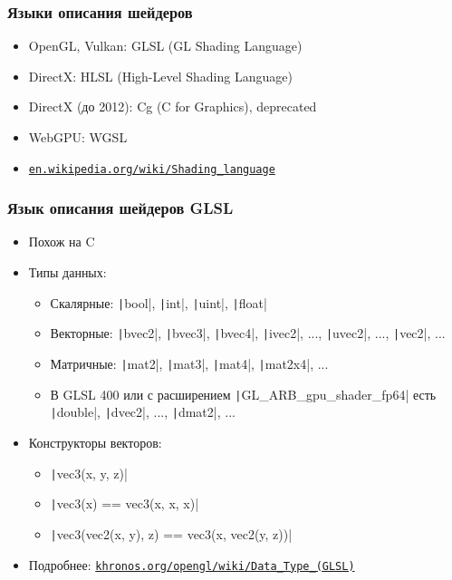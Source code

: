 \documentclass[10pt]{beamer}
\begin{document}
\begin{frame}[fragile]
\frametitle{Языки описания шейдеров}
\begin{itemize}
\item OpenGL, Vulkan: GLSL (GL Shading Language)
\pause
\item DirectX: HLSL (High-Level Shading Language)
\pause
\item DirectX (до 2012): Cg (C for Graphics), deprecated
\pause
\item WebGPU: WGSL
\pause
\item \href{https://en.wikipedia.org/wiki/Shading_language}{\nolinkurl{en.wikipedia.org/wiki/Shading\_language}}
\end{itemize}
\end{frame}

\begin{frame}[fragile]
\frametitle{Язык описания шейдеров GLSL}
\begin{itemize}
\item Похож на C
\pause
\item Типы данных:
\pause
\begin{itemize}
\item Скалярные: \texttt|bool|, \texttt|int|, \texttt|uint|, \texttt|float|
\pause
\item Векторные: \texttt|bvec2|, \texttt|bvec3|, \texttt|bvec4|, \texttt|ivec2|, ..., \texttt|uvec2|, ..., \texttt|vec2|, ...
\pause
\item Матричные: \texttt|mat2|, \texttt|mat3|, \texttt|mat4|, \texttt|mat2x4|, ...
\pause
\item В GLSL 400 или с расширением \texttt|GL_ARB_gpu_shader_fp64| есть \texttt|double|, \texttt|dvec2|, ..., \texttt|dmat2|, ...
\end{itemize}
\pause
\item Конструкторы векторов:
\pause
\begin{itemize}
\item \texttt|vec3(x, y, z)|
\pause
\item \texttt|vec3(x) == vec3(x, x, x)|
\pause
\item \texttt|vec3(vec2(x, y), z) == vec3(x, vec2(y, z))|
\end{itemize}
\pause
\item Подробнее: \href{https://www.khronos.org/opengl/wiki/Data_Type_(GLSL)}{\nolinkurl{khronos.org/opengl/wiki/Data\_Type\_(GLSL)}}
\end{itemize}
\end{frame}
\end{document}
